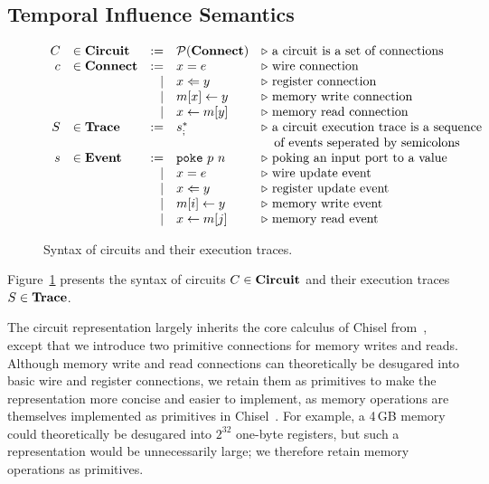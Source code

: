 \subsection{Temporal Influence Semantics}\label{sec:semantics}

\begin{figure}[tp]
    \[
    \begin{array}{rlrll}
        C     & \in \sCircuit & := & \mathcal{P}(\sConnect) & \triangleright\ \text{a circuit is a set of connections} \\
        c     & \in \sConnect & := & x = e & \triangleright\ \text{wire connection} \\
        &               &  | & x \Leftarrow y & \triangleright\ \text{register connection} \\
        &               &  | & m[x] \gets y & \triangleright\ \text{memory write connection} \\
        &               &  | & x \gets m[y] & \triangleright\ \text{memory read connection} \\
        S     & \in \sTrace   & := & s_;^* & \triangleright\ \text{a circuit execution trace is a sequence} \\
        & & & & \ \ \ \text{of events seperated by semicolons}\\
        s     & \in \sEvent  & := & \vpoke p\ n & \triangleright\ \text{poking an input port to a value}\\
        &              &  | & x = e & \triangleright\ \text{wire update event}\\
        &              &  | & x \Leftarrow y & \triangleright\ \text{register update event}\\
        &              &  | & m[i] \gets y & \triangleright\ \text{memory write event}\\
        &              &  | & x \gets m[j] & \triangleright\ \text{memory read event}\\
    \end{array}
    \]
    \caption{Syntax of circuits and their execution traces.}\label{fig:syntax}
\end{figure}

\begin{definition}\label{def:syntax}
    Figure~\ref{fig:syntax} presents the syntax of circuits $C \in \mathbf{Circuit}$ and their execution traces $S \in \mathbf{Trace}$.
\end{definition}

The circuit representation largely inherits the core calculus of Chisel from~\cite{cui_chisa_2026}, except that we introduce two primitive connections for memory writes and reads.
Although memory write and read connections can theoretically be desugared into basic wire and register connections, we retain them as primitives to make the representation more concise and easier to implement, as memory operations are themselves implemented as primitives in Chisel~\cite{bachrach_chisel_2012,izraelevitz_reusability_2017,li_specification_2016}.
For example, a 4\,GB memory could theoretically be desugared into $2^{32}$ one-byte registers, but such a representation would be unnecessarily large; we therefore retain memory operations as primitives.

